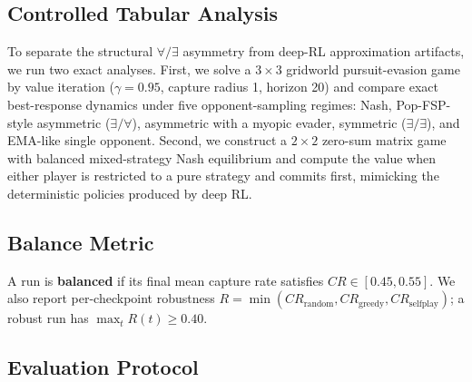 \documentclass[letterpaper, 10pt, journal]{IEEEtran}
\begin{document}
\subsection{Controlled Tabular Analysis}
\label{subsec:tabular}

To separate the structural $\forall/\exists$ asymmetry from deep-RL approximation artifacts, we run two exact analyses. First, we solve a $3{\times}3$ gridworld pursuit-evasion game by value iteration ($\gamma=0.95$, capture radius 1, horizon 20) and compare exact best-response dynamics under five opponent-sampling regimes: Nash, Pop-FSP-style asymmetric ($\exists/\forall$), asymmetric with a myopic evader, symmetric ($\exists/\exists$), and EMA-like single opponent. Second, we construct a $2{\times}2$ zero-sum matrix game with balanced mixed-strategy Nash equilibrium and compute the value when either player is restricted to a pure strategy and commits first, mimicking the deterministic policies produced by deep RL.

\subsection{Balance Metric}
\label{subsec:metric}

A run is \textbf{balanced} if its final mean capture rate satisfies $CR \in [0.45, 0.55]$. We also report per-checkpoint robustness $R = \min(CR_{\text{random}}, CR_{\text{greedy}}, CR_{\text{selfplay}})$; a robust run has $\max_t R(t) \ge 0.40$.

\subsection{Evaluation Protocol}
\label{subsec:eval_protocol}
\end{document}
